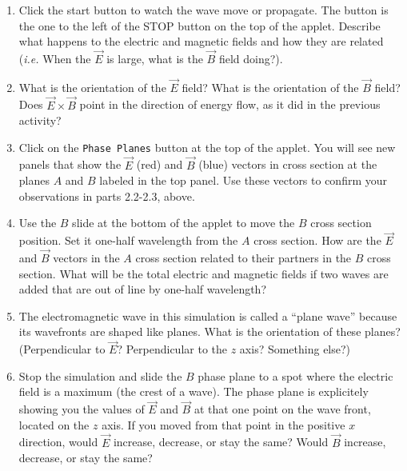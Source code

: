\begin{enumerate}
\item Click the start button to watch the wave move or propagate. The button is the one to the left of the STOP button on the top of the applet.
Describe what happens to the electric and magnetic fields and how they are related
({\it i.e.} When the $\vec E$ is large, what is the $\vec B$ field doing?).
\vspace{3.0cm}

\item What is the orientation of the $\vec E$ field?
What is the orientation of the $\vec B$ field?
Does $\vec E \times \vec B$ point in the direction of energy flow, as it did in the previous activity?
\vspace{2.0cm}


\item Click on the {\tt Phase Planes} button at the top of the applet.
You will see new panels that show the $\vec E$ (red) and $\vec B$ (blue) vectors in cross section at the
planes $A$ and $B$ labeled in the top panel.
Use these vectors to confirm your observations in parts 2.2-2.3, above.
\vspace{3.0cm}

\item Use the $B$ slide at the bottom of the applet to move the $B$ cross 
section position.
Set it one-half wavelength from the $A$ cross section.
How are the $\vec E$ and $\vec B$ vectors in the $A$ cross section related to their partners 
in the $B$ cross section.
What will be the total electric and magnetic fields if two waves are added that are out of line
by one-half wavelength?
\vspace{1.5cm}

\item The electromagnetic wave in this simulation is called a ``plane wave'' because its wavefronts are shaped like planes.  What is the orientation of these planes?  (Perpendicular to $\vec E$?  Perpendicular to the $z$ axis? Something else?) 
\vspace{1.5cm}

\item Stop the simulation and slide the $B$ phase plane to a spot where the electric field is a maximum (the crest of a wave).  The phase plane is explicitely showing you the values of $\vec E$ and $\vec B$ at that one point on the wave front, located on the $z$ axis.  If you moved from that point in the positive $x$ direction, would $\vec E$ increase, decrease, or stay the same?  Would $\vec B$ increase, decrease, or stay the same? 
\vspace{2.0cm}

\end{enumerate}

